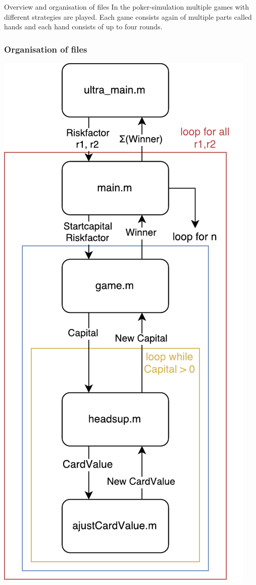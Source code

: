 \documentclass[11pt]{article}
\begin{document}
Overview and organisation of files 
In the poker-simulation multiple games with different strategies are played. Each game consists again of multiple parts called hands and each hand consists of up to four rounds.

\subsubsection{Organisation of files}
\begin{minipage}{0.48\textwidth}
\includegraphics[width=\textwidth]{Graphics/diagram_senkrecht.pdf}
\end{minipage}
\end{document}
